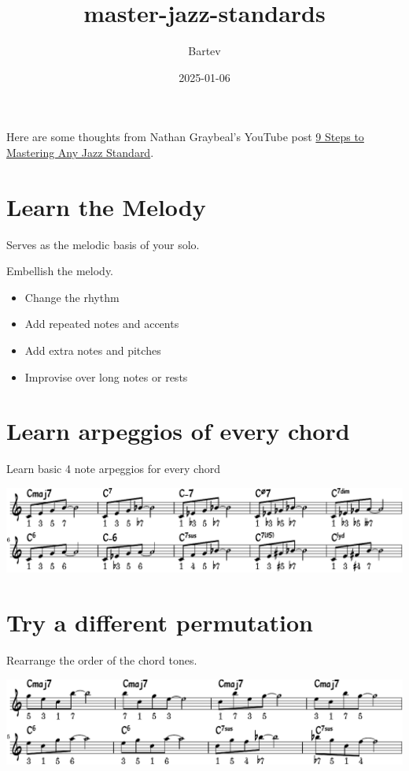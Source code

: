 \documentclass[11pt]{article}
\author{Bartev}
\date{2025-01-06}
\title{master-jazz-standards}
\let\maketitle\relax %
\begin{document}
\maketitle
\tableofcontents

Here are some thoughts from Nathan Graybeal's YouTube post \href{https://www.youtube.com/watch?v=qdobZsTTbbw\&list=LL}{9 Steps to Mastering Any Jazz Standard}.
\section{Learn the Melody}
\label{sec:org0a7ddc5}

Serves as the melodic basis of your solo.

Embellish the melody.
\begin{itemize}
\item Change the rhythm
\item Add repeated notes and accents
\item Add extra notes and pitches
\item Improvise over long notes or rests
\end{itemize}
\section{Learn arpeggios of every chord}
\label{sec:orgc17926e}

Learn basic 4 note arpeggios for every chord

\begin{center}
\includegraphics[width=0.98\linewidth]{arpeggios.pdf}
\end{center}

\section{Try a different permutation}
\label{sec:orgd6c5365}
Rearrange the order of the chord tones.

\begin{center}
\includegraphics[width=0.98\linewidth]{permute-arpeggio.pdf}
\end{center}
\end{document}
